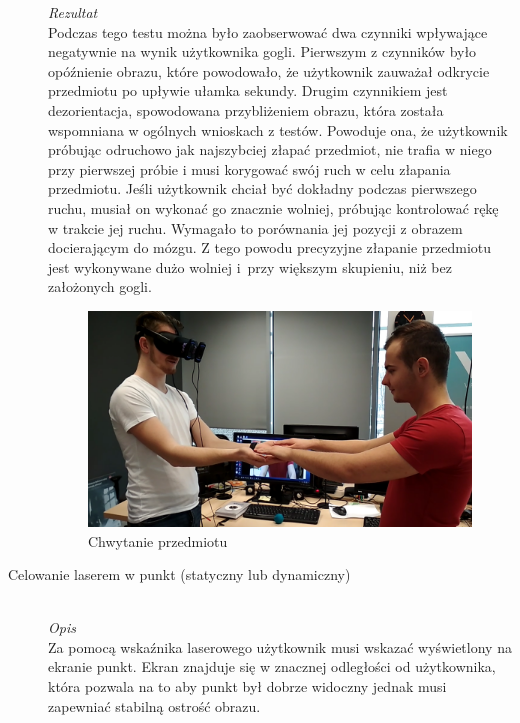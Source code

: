\documentclass[a4paper,11pt,twoside]{report}
\theoremstyle{definition}
\begin{document}
\begin{description}
\textit{Rezultat} \\
Podczas tego testu można było zaobserwować dwa czynniki wpływające negatywnie na wynik użytkownika gogli. Pierwszym z czynników było opóźnienie obrazu, które powodowało, że użytkownik zauważał odkrycie przedmiotu po upływie ułamka sekundy. Drugim czynnikiem jest dezorientacja, spowodowana przybliżeniem obrazu, która została wspomniana w ogólnych wnioskach z testów. Powoduje ona, że użytkownik próbując odruchowo jak najszybciej złapać przedmiot, nie trafia w niego przy pierwszej próbie i musi korygować swój ruch w celu złapania przedmiotu. Jeśli użytkownik chciał być dokładny podczas pierwszego ruchu, musiał on wykonać go znacznie wolniej, próbując kontrolować rękę w trakcie jej ruchu. Wymagało to porównania jej pozycji z obrazem docierającym do mózgu. Z tego powodu precyzyjne złapanie przedmiotu jest wykonywane dużo wolniej i~przy większym skupieniu, niż bez założonych gogli.

\begin{figure}[H]
\centering
\includegraphics[scale=0.25]{images/lapkiTest}
\caption[CaptureTest]{Chwytanie przedmiotu}
\end{figure}

\item[Celowanie laserem w punkt (statyczny lub dynamiczny)] \hfill \\
\textit{Opis} \\
Za pomocą wskaźnika laserowego użytkownik musi wskazać wyświetlony na ekranie punkt. Ekran znajduje się w znacznej odległości od użytkownika, która pozwala na to aby punkt był dobrze widoczny jednak musi zapewniać stabilną ostrość obrazu.


\end{description}
\end{document}
